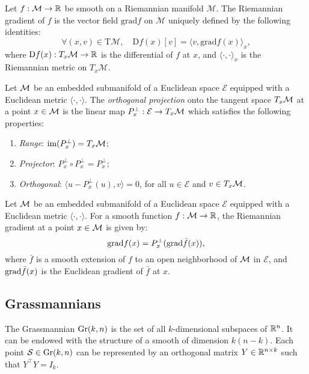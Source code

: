 \begin{definition}
    Let $f : \mathcal{M} \to \mathbb{R}$ be smooth on a Riemannian manifold $\mathcal{M}$. The Riemannian gradient of $f$ is the vector field $\textrm{grad}f$ on $\mathcal{M}$ uniquely defined by the following identities:
    \[
        \forall (x,v) \in \textrm{T}\mathcal{M}, \quad \textrm{D}f(x)[v] = \langle v, \textrm{grad}f(x) \rangle_x,
    \]
    where $\textrm{D}f(x) : T_x \mathcal{M} \to \mathbb{R}$ is the differential of $f$ at $x$, and $\langle \cdot, \cdot \rangle_x$ is the Riemannian metric on $T_x \mathcal{M}$.
\end{definition}

\begin{definition}[Projection]
    Let $\mathcal{M}$ be an embedded submanifold of a Euclidean space $\mathcal{E}$ equipped with a Euclidean metric $\langle \cdot, \cdot \rangle$. The \emph{orthogonal projection} onto the tangent space $T_x \mathcal{M}$ at a point $x \in \mathcal{M}$ is the linear map $P^{\perp}_x : \mathcal{E} \to T_x \mathcal{M}$ which satisfies the following properties:
    \begin{enumerate}
        \item \emph{Range}: $\textrm{im}(P^{\perp}_x) = T_x \mathcal{M}$;
        \item \emph{Projector}: $P^{\perp}_x \circ P^{\perp}_x = P^{\perp}_x$;
        \item \emph{Orthogonal}: $\langle u - P^{\perp}_x(u), v \rangle = 0$, for all $u \in \mathcal{E}$ and $v \in T_x \mathcal{M}$.
    \end{enumerate}
    
\end{definition}

\begin{proposition}\label{prop:riem_grad}
    Let $\mathcal{M}$ be an embedded submanifold of a Euclidean space $\mathcal{E}$ equipped with a Euclidean metric $\langle \cdot, \cdot \rangle$. For a smooth function $f : \mathcal{M} \to \mathbb{R}$, the Riemannian gradient at a point $x \in \mathcal{M}$ is given by:
    \[
        \textrm{grad}f(x) = P^{\perp}_x(\mathrm{grad }{\bar{f}}(x)),
    \]
    where $\bar{f}$ is a smooth extension of $f$ to an open neighborhood of $\mathcal{M}$ in $\mathcal{E}$, and $\mathrm{grad }{\bar{f}}(x)$ is the Euclidean gradient of $\bar{f}$ at $x$.
\end{proposition}

\subsection{Grassmannians}
The Grassmannian $\text{Gr}(k,n)$ is the set of all $k$-dimensional subspaces of $\mathbb{R}^n$. It can be endowed with the structure of a smooth  of dimension $k(n-k)$. Each point $\mathcal{S} \in \text{Gr}(k,n)$ can be represented by an orthogonal matrix $Y \in \mathbb{R}^{n \times k}$ such that $Y^\top Y = I_k$.

